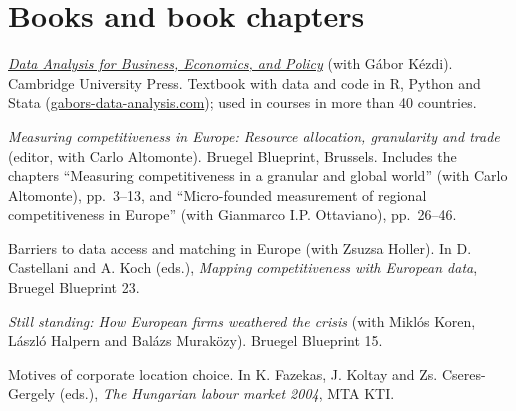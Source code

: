 \documentclass[10pt,a4paper]{article}
\begin{document}
\section{Books and book chapters}
\begin{cvlist}
  \item[2021] \href{https://gabors-data-analysis.com}{\textit{Data Analysis for Business, Economics, and Policy}} (with Gábor Kézdi). Cambridge University Press. Textbook with data and code in R, Python and Stata (\href{https://gabors-data-analysis.com}{gabors-data-analysis.com}); used in courses in more than 40 countries.
  \item[2016] \textit{Measuring competitiveness in Europe: Resource allocation, granularity and trade} (editor, with Carlo Altomonte). Bruegel Blueprint, Brussels. Includes the chapters ``Measuring competitiveness in a granular and global world'' (with Carlo Altomonte), pp.\ 3--13, and ``Micro-founded measurement of regional competitiveness in Europe'' (with Gianmarco I.P. Ottaviano), pp.\ 26--46.
  \item[2015] Barriers to data access and matching in Europe (with Zsuzsa Holler). In D. Castellani and A. Koch (eds.), \textit{Mapping competitiveness with European data}, Bruegel Blueprint 23.
  \item[2011] \textit{Still standing: How European firms weathered the crisis} (with Miklós Koren, László Halpern and Balázs Muraközy). Bruegel Blueprint 15.
  \item[2004] Motives of corporate location choice. In K. Fazekas, J. Koltay and Zs. Cseres-Gergely (eds.), \textit{The Hungarian labour market 2004}, MTA KTI.
\end{cvlist}

\end{document}
